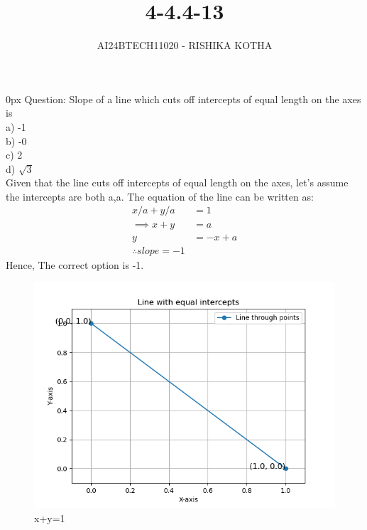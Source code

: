 \documentclass[journal]{IEEEtran}
\begin{document}

\vspace{3cm}

\title{4-4.4-13}
\author{AI24BTECH11020 - RISHIKA KOTHA}
{\let\newpage\relax\maketitle}

\renewcommand{\thefigure}{\theenumi}
\renewcommand{\thetable}{\theenumi}
\setlength{\intextsep}{10pt} %


\renewcommand{\thetable}{\theenumi}
\parindent 0px
Question:
Slope of a line which cuts off intercepts of equal length on the axes is\\
a) -1\\
b) -0\\
c)  2\\
d) $\sqrt{3}$\\
\solution
Given that the line cuts off intercepts of equal length on the axes, let's assume the intercepts are both a,a. The equation of the line can be written as:
\\
\begin{align}
	     x/a+y/a &= 1\\
	\implies x+y &= a\\
	            y&=-x+a\\
\therefore slope= -1
\end{align}
Hence, The correct option is -1.
\begin{table}[h!]    
  \centering
  
  \caption{}
  \label{tab10.5.3.9.1}
\end{table}
\begin{figure}[h!]
	\centering
	\includegraphics[width=0.7\linewidth]{figs/Fig1.png}
	\caption{x+y=1}
\end{figure}
\end{document}
